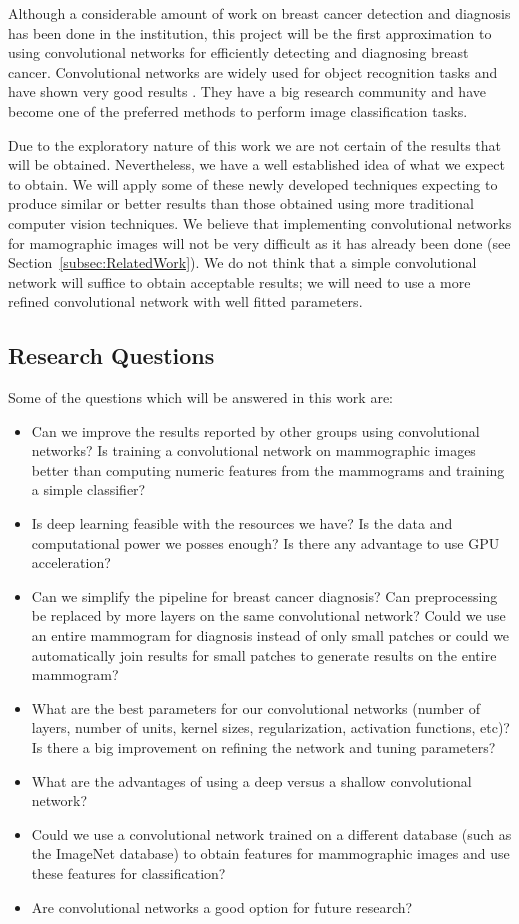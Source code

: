 Although a considerable amount of work on breast cancer detection and diagnosis has been done in the institution, this project will be the first approximation to using convolutional networks for efficiently detecting and diagnosing breast cancer. Convolutional networks are widely used for object recognition tasks and have shown very good results \cite{Russakovsky2014, Taigman2014, Dieleman2015}. They have a big research community and have become one of the preferred methods to perform image classification tasks.%

Due to the exploratory nature of this work we are not certain of the results that will be obtained. Nevertheless, we have a well established idea of what we expect to obtain. We will apply some of these newly developed techniques expecting to produce similar or better results than those obtained using more traditional computer vision techniques. We believe that implementing convolutional networks for mamographic images will not be very difficult as it has already been done (see Section~\ref{subsec:RelatedWork}). We do not think that a simple convolutional network will suffice to obtain acceptable results; we will need to use a more refined convolutional network with well fitted parameters.

\subsection{Research Questions}
Some of the questions which will be answered in this work are:
\begin{itemize} 
	\item Can we improve the results reported by other groups using convolutional networks? Is training a convolutional network on mammographic images better than computing numeric features from the mammograms and training a simple classifier?
	\item Is deep learning feasible with the resources we have? Is the data and computational power we posses enough? Is there any advantage to use GPU acceleration?
	\item Can we simplify the pipeline for breast cancer diagnosis? Can preprocessing be replaced by more layers on the same convolutional network? Could we use an entire mammogram for diagnosis instead of only small patches or could we automatically join results for small patches to generate results on the entire mammogram?
	\item What are the best parameters for our convolutional networks (number of layers, number of units, kernel sizes, regularization, activation functions, etc)? Is there a big improvement on refining the network and tuning parameters?
	\item What are the advantages of using a deep versus a shallow convolutional network? 
	\item Could we use a convolutional network trained on a different database (such as the ImageNet database) to obtain features for mammographic images and use these features for classification?
	\item Are convolutional networks a good option for future research?
\end{itemize}

